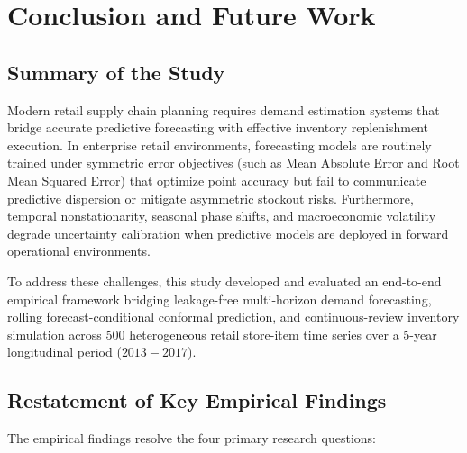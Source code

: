 \section{Conclusion and Future Work}

\subsection{Summary of the Study}
Modern retail supply chain planning requires demand estimation systems that bridge accurate predictive forecasting with effective inventory replenishment execution. In enterprise retail environments, forecasting models are routinely trained under symmetric error objectives (such as Mean Absolute Error and Root Mean Squared Error) that optimize point accuracy but fail to communicate predictive dispersion or mitigate asymmetric stockout risks. Furthermore, temporal nonstationarity, seasonal phase shifts, and macroeconomic volatility degrade uncertainty calibration when predictive models are deployed in forward operational environments.

To address these challenges, this study developed and evaluated an end-to-end empirical framework bridging leakage-free multi-horizon demand forecasting, rolling forecast-conditional conformal prediction, and continuous-review inventory simulation across 500 heterogeneous retail store-item time series over a 5-year longitudinal period ($2013-2017$).

\subsection{Restatement of Key Empirical Findings}
The empirical findings resolve the four primary research questions:

